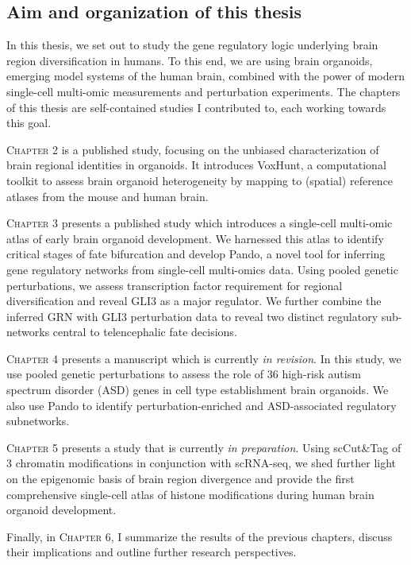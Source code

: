 \clearpage

\subsection{Aim and organization of this thesis}

In this thesis, we set out to study the gene regulatory logic underlying brain region diversification in humans. To this end, we are using brain organoids, emerging model systems of the human brain, combined with the power of modern single-cell multi-omic measurements and perturbation experiments. 
The chapters of this thesis are self-contained studies I contributed to, each working towards this goal.

{\scshape Chapter 2} is a published study, focusing on the unbiased characterization of brain regional identities in organoids. It introduces VoxHunt, a computational toolkit to assess brain organoid heterogeneity by mapping to (spatial) reference atlases from the mouse and human brain.

{\scshape Chapter 3} presents a published study which introduces a single-cell multi-omic atlas of early brain organoid development. We harnessed this atlas to identify critical stages of fate bifurcation and develop Pando, a novel tool for inferring gene regulatory networks from single-cell multi-omics data. Using pooled genetic perturbations, we assess transcription factor requirement for regional diversification and reveal GLI3 as a major regulator. We further combine the inferred GRN with GLI3 perturbation data to reveal two distinct regulatory sub-networks central to telencephalic fate decisions.

{\scshape Chapter 4} presents a manuscript which is currently \textit{in revision}. In this study, we use pooled genetic perturbations to assess the role of 36 high-risk autism spectrum disorder (ASD) genes in cell type  establishment brain organoids. We also use Pando to identify perturbation-enriched and ASD-associated regulatory subnetworks.

{\scshape Chapter 5} presents a study that is currently \textit{in preparation}. Using scCut\&Tag of 3 chromatin modifications in conjunction with scRNA-seq, we shed further light on the epigenomic basis of brain region divergence and provide the first comprehensive single-cell atlas of histone modifications during human brain organoid development.

Finally, in {\scshape Chapter 6}, I summarize the results of the previous chapters, discuss their implications and outline further research perspectives.


